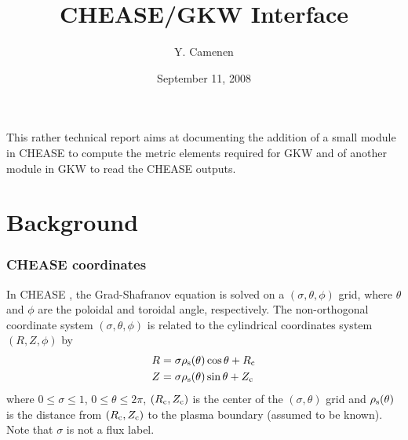 \documentclass[a4paper,12pt]{article}
\title{CHEASE/GKW Interface}
\author{Y. Camenen}
\date{September 11, 2008}
\newcommand{\ind}[1]{\ensuremath{_{\rm{#1}}}}
\begin{document}
\maketitle

%

This rather technical report aims at documenting the addition of a small module in CHEASE to compute the metric elements required for GKW and of another module in GKW to read the CHEASE outputs.

\part{Background}
\section{CHEASE coordinates}
In CHEASE \cite{Lutjens:Comput1992, Lutjens:Comput1996}, the Grad-Shafranov equation is solved on a $\left(\sigma,\theta,\phi\right)$ grid, where $\theta$ and $\phi$ are the poloidal and toroidal
angle, respectively. The
non-orthogonal coordinate system $\left(\sigma,\theta,\phi\right)$ is related to the cylindrical coordinates system $\left(R,Z,\phi\right)$ by
\begin{equation}
\begin{aligned}
R&=\sigma\rho\ind{s}(\theta)\cos{\theta} + R\ind{c} \nonumber \\
Z&=\sigma\rho\ind{s}(\theta)\sin{\theta} + Z\ind{c} \nonumber
\end{aligned}
\end{equation}
where $0 \leq \sigma \leq 1$, $0\leq \theta \leq 2\pi$, $\left(R\ind{c},Z\ind{c}\right)$ is the center of the $\left(\sigma,\theta\right)$ grid and $\rho\ind{s}(\theta)$ is the distance from $\left(R\ind{c},Z\ind{c}\right)$ to the plasma boundary (assumed to be known). Note that $\sigma$ is not a flux label.
\end{document}
